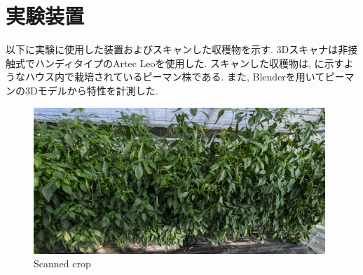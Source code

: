 \section{実験装置}
以下に実験に使用した装置およびスキャンした収穫物を示す.
3Dスキャナは非接触式でハンディタイプのArtec Leoを使用した.
スキャンした収穫物は, に示すようなハウス内で栽培されているピーマン株である.
また, Blenderを用いてピーマンの3Dモデルから特性を計測した.

\vspace{5mm}
\begin{figure}[H]
     \centering
     \includegraphics[width=110mm]{images/png/plant.png}
     \caption{Scanned crop}
     \label{Fig:plant}
   \end{figure}